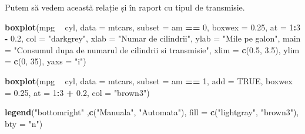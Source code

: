 \documentclass[]{article}
\newenvironment{Shaded}{\begin{snugshade}}{\end{snugshade}}
\newcommand{\KeywordTok}[1]{\textcolor[rgb]{0.13,0.29,0.53}{\textbf{#1}}}
\newcommand{\DataTypeTok}[1]{\textcolor[rgb]{0.13,0.29,0.53}{#1}}
\newcommand{\DecValTok}[1]{\textcolor[rgb]{0.00,0.00,0.81}{#1}}
\newcommand{\FloatTok}[1]{\textcolor[rgb]{0.00,0.00,0.81}{#1}}
\newcommand{\StringTok}[1]{\textcolor[rgb]{0.31,0.60,0.02}{#1}}
\newcommand{\OtherTok}[1]{\textcolor[rgb]{0.56,0.35,0.01}{#1}}
\newcommand{\OperatorTok}[1]{\textcolor[rgb]{0.81,0.36,0.00}{\textbf{#1}}}
\newcommand{\NormalTok}[1]{#1}
\begin{document}
Putem să vedem această relație și în raport cu tipul de transmisie.

\begin{Shaded}
\begin{Highlighting}[]
\KeywordTok{boxplot}\NormalTok{(mpg }\OperatorTok{~}\StringTok{ }\NormalTok{cyl, }
        \DataTypeTok{data =}\NormalTok{ mtcars, }
        \DataTypeTok{subset =}\NormalTok{ am }\OperatorTok{==}\StringTok{ }\DecValTok{0}\NormalTok{,}
        \DataTypeTok{boxwex =} \FloatTok{0.25}\NormalTok{, }
        \DataTypeTok{at =} \DecValTok{1}\OperatorTok{:}\DecValTok{3} \OperatorTok{-}\StringTok{ }\FloatTok{0.2}\NormalTok{,}
        \DataTypeTok{col =} \StringTok{"darkgrey"}\NormalTok{,}
        \DataTypeTok{xlab =} \StringTok{"Numar de cilindrii"}\NormalTok{,}
        \DataTypeTok{ylab =} \StringTok{"Mile pe galon"}\NormalTok{, }
        \DataTypeTok{main =} \StringTok{"Consumul dupa de numarul de cilindrii si transmisie"}\NormalTok{,}
        \DataTypeTok{xlim =} \KeywordTok{c}\NormalTok{(}\FloatTok{0.5}\NormalTok{, }\FloatTok{3.5}\NormalTok{), }
        \DataTypeTok{ylim =} \KeywordTok{c}\NormalTok{(}\DecValTok{0}\NormalTok{, }\DecValTok{35}\NormalTok{),}
        \DataTypeTok{yaxs =} \StringTok{"i"}\NormalTok{)}

\KeywordTok{boxplot}\NormalTok{(mpg }\OperatorTok{~}\StringTok{ }\NormalTok{cyl, }
        \DataTypeTok{data =}\NormalTok{ mtcars, }
        \DataTypeTok{subset =}\NormalTok{ am }\OperatorTok{==}\StringTok{ }\DecValTok{1}\NormalTok{,}
        \DataTypeTok{add =} \OtherTok{TRUE}\NormalTok{,}
        \DataTypeTok{boxwex =} \FloatTok{0.25}\NormalTok{, }
        \DataTypeTok{at =} \DecValTok{1}\OperatorTok{:}\DecValTok{3} \OperatorTok{+}\StringTok{ }\FloatTok{0.2}\NormalTok{,}
        \DataTypeTok{col =} \StringTok{"brown3"}\NormalTok{)}

\KeywordTok{legend}\NormalTok{(}\StringTok{"bottomright"}\NormalTok{ ,}\KeywordTok{c}\NormalTok{(}\StringTok{"Manuala"}\NormalTok{, }\StringTok{"Automata"}\NormalTok{),}
       \DataTypeTok{fill =} \KeywordTok{c}\NormalTok{(}\StringTok{"lightgray"}\NormalTok{, }\StringTok{"brown3"}\NormalTok{), }\DataTypeTok{bty =} \StringTok{"n"}\NormalTok{)}
\end{Highlighting}
\end{Shaded}
\end{document}
